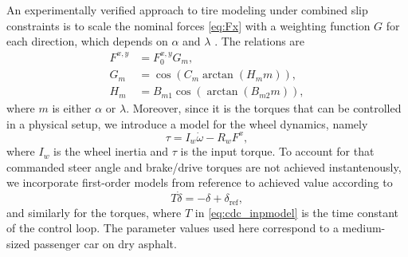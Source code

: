 \documentclass[11pt,a4paper]{article}
\begin{document}
An experimentally verified approach to tire modeling under combined slip constraints is to scale the
nominal forces \eqref{eq:Fx} with a weighting
function $G$ for each direction, which depends on $\alpha$ and $\lambda$ \cite{Pacejka2006}. The relations are
\begin{equation}
\label{eq:cdc_WFX}
\begin{aligned}
F^{x,y} &= F^{x,y}_{0} G_{m},  \\
G_{m} &= \cos( C_{m} \arctan(H_{m} m) ) , \\
H_{m} &= B_{m 1} \cos(\arctan(B_{m 2} m)),
\end{aligned}
\end{equation}
where $m$ is either  $\alpha$ or $\lambda$.
Moreover, since it is the torques that can be controlled in a physical setup, we introduce a model for the wheel dynamics, namely
\begin{equation*}
\tau = I_w \dot{\omega}-R_wF^x, %
\end{equation*}
where $I_w$ is the wheel  inertia and $\tau$ is the input torque.
To account for that  commanded steer angle and brake/drive torques are not achieved instantenously, we incorporate first-order models from reference to achieved value according to
\begin{equation}
T\dot \delta = -\delta+ \delta_\mathrm{ref},\label{eq:cdc_inpmodel}
\end{equation} 
and similarly for the torques, where $T$ in \eqref{eq:cdc_inpmodel} is the time constant of the  control loop. The parameter values used here correspond to a medium-sized passenger car on dry asphalt.
\end{document}
